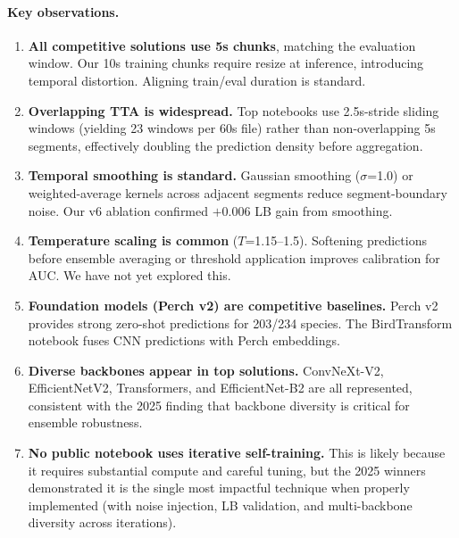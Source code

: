 \paragraph{Key observations.}
\begin{enumerate}
    \item \textbf{All competitive solutions use 5s chunks}, matching the
    evaluation window. Our 10s training chunks require resize at inference,
    introducing temporal distortion. Aligning train/eval duration is standard.

    \item \textbf{Overlapping TTA is widespread.}
    Top notebooks use 2.5s-stride sliding windows (yielding 23 windows per
    60s file) rather than non-overlapping 5s segments, effectively doubling
    the prediction density before aggregation.

    \item \textbf{Temporal smoothing is standard.}
    Gaussian smoothing ($\sigma$=1.0) or weighted-average kernels across
    adjacent segments reduce segment-boundary noise. Our v6 ablation
    confirmed $+0.006$ LB gain from smoothing.

    \item \textbf{Temperature scaling is common} ($T$=1.15--1.5).
    Softening predictions before ensemble averaging or threshold application
    improves calibration for AUC. We have not yet explored this.

    \item \textbf{Foundation models (Perch v2) are competitive baselines.}
    Perch v2 provides strong zero-shot predictions for 203/234 species.
    The BirdTransform notebook fuses CNN predictions with Perch embeddings.

    \item \textbf{Diverse backbones appear in top solutions.}
    ConvNeXt-V2, EfficientNetV2, Transformers, and EfficientNet-B2 are all
    represented, consistent with the 2025 finding that backbone diversity
    is critical for ensemble robustness.

    \item \textbf{No public notebook uses iterative self-training.}
    This is likely because it requires substantial compute and careful tuning,
    but the 2025 winners demonstrated it is the single most impactful technique
    when properly implemented (with noise injection, LB validation, and
    multi-backbone diversity across iterations).
\end{enumerate}

